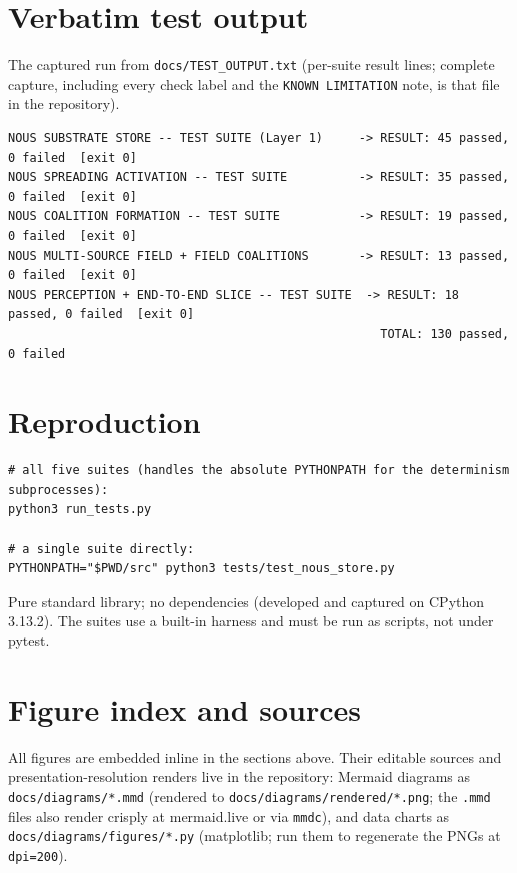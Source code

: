 \documentclass[11pt]{article}
\newcommand{\code}[1]{\texttt{#1}}
\begin{document}
\appendix

\section{Verbatim test output}
The captured run from \code{docs/TEST_OUTPUT.txt} (per-suite result lines; complete capture, including
every check label and the \code{KNOWN LIMITATION} note, is that file in the repository).

\begin{verbatim}
NOUS SUBSTRATE STORE -- TEST SUITE (Layer 1)     -> RESULT: 45 passed, 0 failed  [exit 0]
NOUS SPREADING ACTIVATION -- TEST SUITE          -> RESULT: 35 passed, 0 failed  [exit 0]
NOUS COALITION FORMATION -- TEST SUITE           -> RESULT: 19 passed, 0 failed  [exit 0]
NOUS MULTI-SOURCE FIELD + FIELD COALITIONS       -> RESULT: 13 passed, 0 failed  [exit 0]
NOUS PERCEPTION + END-TO-END SLICE -- TEST SUITE  -> RESULT: 18 passed, 0 failed  [exit 0]
                                                    TOTAL: 130 passed, 0 failed
\end{verbatim}

\section{Reproduction}
\begin{verbatim}
# all five suites (handles the absolute PYTHONPATH for the determinism subprocesses):
python3 run_tests.py

# a single suite directly:
PYTHONPATH="$PWD/src" python3 tests/test_nous_store.py
\end{verbatim}
Pure standard library; no dependencies (developed and captured on CPython 3.13.2). The suites use a
built-in harness and must be run as scripts, not under pytest.

\section{Figure index and sources}
All figures are embedded inline in the sections above. Their editable sources and
presentation-resolution renders live in the repository: Mermaid diagrams as \code{docs/diagrams/*.mmd}
(rendered to \code{docs/diagrams/rendered/*.png}; the \code{.mmd} files also render crisply at
mermaid.live or via \code{mmdc}), and data charts as \code{docs/diagrams/figures/*.py} (matplotlib;
run them to regenerate the PNGs at \code{dpi=200}).
\end{document}
